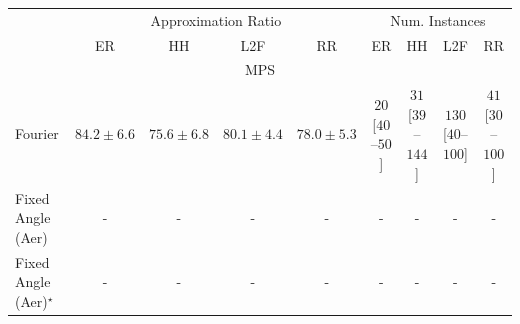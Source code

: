 \begin{tabular}{l|cccc|cccc|}
\toprule
& \multicolumn{4}{c|}{Approximation Ratio} & \multicolumn{4}{c|}{Num. Instances} \\
            & ER & HH & L2F & RR & ER & HH & L2F & RR \\
\midrule
\multicolumn{9}{c}{\rule{0pt}{8pt}MPS} \\
\midrule
Fourier & {\cellcolor[HTML]{DC5E0B}} \color[HTML]{F1F1F1} $84.2\pm 6.6$ & {\cellcolor[HTML]{FED16B}} \color[HTML]{000000} $75.6\pm 6.8$ & {\cellcolor[HTML]{FC9427}} \color[HTML]{000000} $80.1\pm 4.4$ & {\cellcolor[HTML]{FEB340}} \color[HTML]{000000} $78.0\pm 5.3$ & {\cellcolor[HTML]{FFF5F1}} \color[HTML]{000000} $20$ [$40$--$50$] & {\cellcolor[HTML]{FFF3EF}} \color[HTML]{000000} $31$ [$39$--$144$] & {\cellcolor[HTML]{FDDBD7}} \color[HTML]{000000} $130$ [$40$--$100$] & {\cellcolor[HTML]{FEF0EC}} \color[HTML]{000000} $41$ [$30$--$100$] \\
Fixed Angle (Aer) & {\cellcolor[HTML]{000000}} \color[HTML]{F1F1F1} {\cellcolor{white}} \color{black} - & {\cellcolor[HTML]{000000}} \color[HTML]{F1F1F1} {\cellcolor{white}} \color{black} - & {\cellcolor[HTML]{000000}} \color[HTML]{F1F1F1} {\cellcolor{white}} \color{black} - & {\cellcolor[HTML]{000000}} \color[HTML]{F1F1F1} {\cellcolor{white}} \color{black} - & {\cellcolor[HTML]{000000}} \color[HTML]{F1F1F1} {\cellcolor{white}} \color{black} - & {\cellcolor[HTML]{000000}} \color[HTML]{F1F1F1} {\cellcolor{white}} \color{black} - & {\cellcolor[HTML]{000000}} \color[HTML]{F1F1F1} {\cellcolor{white}} \color{black} - & {\cellcolor[HTML]{000000}} \color[HTML]{F1F1F1} {\cellcolor{white}} \color{black} - \\
Fixed Angle (Aer)$^\star$ & {\cellcolor[HTML]{000000}} \color[HTML]{F1F1F1} {\cellcolor{white}} \color{black} - & {\cellcolor[HTML]{000000}} \color[HTML]{F1F1F1} {\cellcolor{white}} \color{black} - & {\cellcolor[HTML]{000000}} \color[HTML]{F1F1F1} {\cellcolor{white}} \color{black} - & {\cellcolor[HTML]{000000}} \color[HTML]{F1F1F1} {\cellcolor{white}} \color{black} - & {\cellcolor[HTML]{000000}} \color[HTML]{F1F1F1} {\cellcolor{white}} \color{black} - & {\cellcolor[HTML]{000000}} \color[HTML]{F1F1F1} {\cellcolor{white}} \color{black} - & {\cellcolor[HTML]{000000}} \color[HTML]{F1F1F1} {\cellcolor{white}} \color{black} - & {\cellcolor[HTML]{000000}} \color[HTML]{F1F1F1} {\cellcolor{white}} \color{black} - \\

\end{tabular}
